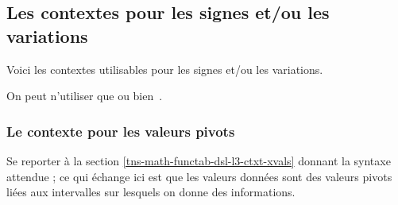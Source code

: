 \documentclass[10pt, a4paper]{article}
\begin{document}

\subsection{Les contextes pour les signes et/ou les variations}

Voici les contextes utilisables pour les signes et/ou les variations.

\medskip

\begin{itemize*}[before = \leavevmode\kern15pt, itemjoin = \kern15pt]
	\item {}

	\item {}

	\item {}
\end{itemize*}


\begin{tdocnote}
	On peut n'utiliser que  ou bien \,.
\end{tdocnote}




\subsubsection{Le contexte  pour les valeurs pivots}

Se reporter à la section \ref{tns-math-functab-dsl-l3-ctxt-xvals} donnant la syntaxe attendue ; ce qui échange ici est que les valeurs données sont des valeurs pivots liées aux intervalles sur lesquels on donne des informations.
\end{document}
